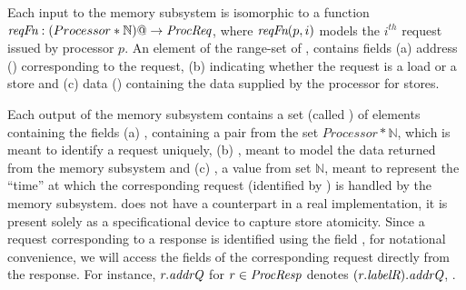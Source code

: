 Each input to the memory subsystem is isomorphic to a function
$\textit{reqFn}:(Processor*\mathbb{N}) @-> \textit{ProcReq}$, where $\textit{reqFn}(p, i)$ models the
$i^{th}$ request issued by processor $p$. An element of the range-set of
\reqFn{}, \viz \Request{} contains fields (a) address (\addrQ) corresponding to
the request, (b) \desc{} indicating whether the request is a load or a store
and (c) data (\dataQ) containing the data supplied by the processor for stores.

Each output of the memory subsystem contains a set (called \Response) of
elements containing the fields (a) , containing a pair from the set
$Processor*\mathbb{N}$, which is meant to identify a request uniquely, (b)
\dataR, meant to model the data returned from the memory subsystem and (c)
\timeR, a value from set $\mathbb{N}$, meant to represent the ``time'' at which
the corresponding request (identified by ) is handled by the memory
subsystem. \timeR{} does not have a counterpart in a real implementation, it is
present solely as a specificational device to capture store atomicity. Since a
request corresponding to a response is identified using the field , for
notational convenience, we will access the fields of the corresponding request
directly from the response. For instance, $r.\textit{addrQ}$ for $r \in \textit{ProcResp}$
denotes $(r.\textit{labelR}).\textit{addrQ}$, \etc.

